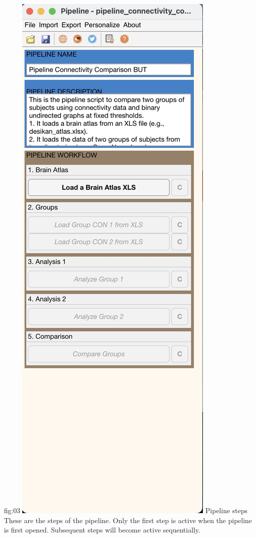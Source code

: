 \documentclass[justified]{tufte-handout}
\begin{document}
	{fig:03}
	{
	\includegraphics{fig03.jpg}
	}
	{Pipeline steps}
	{
	These are the steps of the pipeline. Only the first step is active when the pipeline is first opened. Subsequent steps will become active sequentially.
	}
\end{document}

